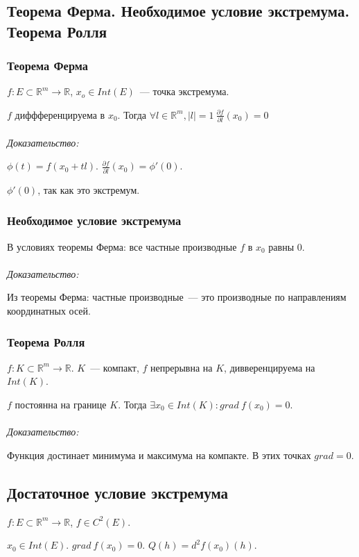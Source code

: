 \documentclass[paper=a4, fontsize=11pt]{article}
\begin{document}
\subsection{Теорема Ферма. Необходимое условие экстремума. Теорема Ролля}
\subsubsection{Теорема Ферма}
$f: E \subset \mathds{R}^m \rightarrow \mathds{R}$, $x_o \in Int(E)$~--- точка экстремума.

$f$ диффференцируема в $x_0$. Тогда $\forall l \in \mathds{R}^m, |l|=1\ \frac{\partial f}{\partial l}(x_0)=0$
\\\\
\emph{Доказательство:}

$\phi(t) = f(x_0 + tl)$. $\frac{\partial f}{\partial l}(x_0) = \phi'(0)$.

$\phi'(0)$, так как это экстремум.

\subsubsection{Необходимое условие экстремума}
В условиях теоремы Ферма: все частные производные $f$ в $x_0$ равны $0$.
\\\\
\emph{Доказательство:}

Из теоремы Ферма: частные производные~--- это производные по направлениям координатных осей.

\subsubsection{Теорема Ролля}
$f: K \subset \mathds{R}^m \rightarrow \mathds{R}$. $K$~--- компакт, $f$ непрерывна на $K$, дивверенцируема на $Int(K)$.

$f$ постоянна на границе $K$. Тогда $\exists x_0 \in Int(K): grad\ f(x_0) = 0$.
\\\\
\emph{Доказательство:}

Функция достинает минимума и максимума на компакте. В этих точках $grad=0$.

\subsection{Достаточное условие экстремума}
$f: E \subset \mathds{R}^m \rightarrow \mathds{R}$, $f \in C^2(E)$.

$x_0 \in Int(E)$. $grad\ f(x_0) = 0$. $Q(h) = d^2 f(x_0)(h)$.
\end{document}
